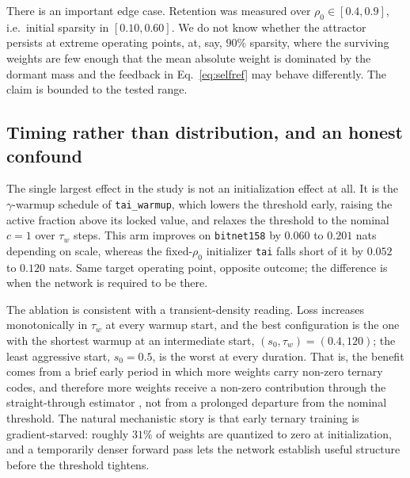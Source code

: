 \documentclass[final,5p,times,twocolumn]{elsarticle}
\theoremstyle{remark}
\newcommand{\rhoz}{\rho_{0}}
\begin{document}
There is an important edge case. Retention was measured over
$\rhoz \in [0.4, 0.9]$, i.e.\ initial sparsity in $[0.10, 0.60]$. We do not
know whether the attractor persists at extreme operating points, at, say,
$90\%$ sparsity, where the surviving weights are few enough that the mean
absolute weight is dominated by the dormant mass and the feedback in
Eq.~\eqref{eq:selfref} may behave differently. The claim is bounded to the
tested range.

\subsection{Timing rather than distribution, and an honest confound}
\label{sec:disc-timing}

The single largest effect in the study is not an initialization effect at all.
It is the $\gamma$-warmup schedule of \texttt{tai\_warmup}, which lowers the
threshold early, raising the active fraction above its locked value, and
relaxes the threshold to the nominal $c = 1$ over $\tau_w$ steps. This arm improves on
\texttt{bitnet158} by $0.060$ to $0.201$ nats depending on scale, whereas the
fixed-$\rhoz$ initializer \texttt{tai} falls short of it by $0.052$ to
$0.120$ nats. Same target operating point,
opposite outcome; the difference is when the network is required to be there.

The ablation is consistent with a transient-density reading. Loss increases
monotonically in $\tau_w$ at every warmup start, and the best configuration is
the one with the shortest warmup at an intermediate start,
$(s_0, \tau_w) = (0.4, 120)$; the least aggressive start, $s_0 = 0.5$, is the
worst at every duration.
That is, the benefit comes from a brief early period in which more weights
carry non-zero ternary codes, and therefore more weights receive a non-zero
contribution through the straight-through estimator \cite{bengio2013}, not
from a prolonged departure from the nominal threshold. The natural mechanistic
story is that early ternary training is gradient-starved: roughly $31\%$ of
weights are quantized to zero at initialization, and a temporarily denser
forward pass lets the network establish useful structure before the threshold
tightens.
\end{document}
